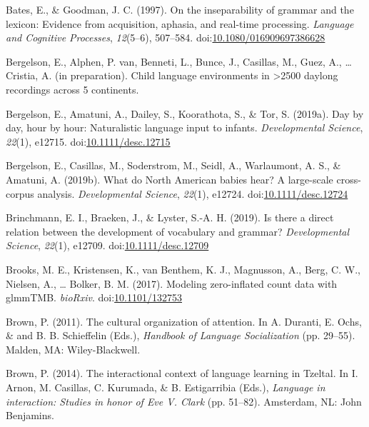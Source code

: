 \documentclass[,man,floatsintext]{apa6}
\begin{document}
\hypertarget{ref-bates1997inseparability}{}
Bates, E., \& Goodman, J. C. (1997). On the inseparability of grammar
and the lexicon: Evidence from acquisition, aphasia, and real-time
processing. \emph{Language and Cognitive Processes}, \emph{12}(5--6),
507--584.
doi:\href{https://doi.org/10.1080/016909697386628}{10.1080/016909697386628}

\hypertarget{ref-bergelsonIPbsl}{}
Bergelson, E., Alphen, P. van, Benneti, L., Bunce, J., Casillas, M.,
Guez, A., \ldots{} Cristia, A. (in preparation). Child language
environments in \textgreater{}2500 daylong recordings across 5
continents.

\hypertarget{ref-bergelson2019day}{}
Bergelson, E., Amatuni, A., Dailey, S., Koorathota, S., \& Tor, S.
(2019a). Day by day, hour by hour: Naturalistic language input to
infants. \emph{Developmental Science}, \emph{22}(1), e12715.
doi:\href{https://doi.org/10.1111/desc.12715}{10.1111/desc.12715}

\hypertarget{ref-bergelsoncasillas2019what}{}
Bergelson, E., Casillas, M., Soderstrom, M., Seidl, A., Warlaumont, A.
S., \& Amatuni, A. (2019b). What do North American babies hear? A
large-scale cross-corpus analysis. \emph{Developmental Science},
\emph{22}(1), e12724.
doi:\href{https://doi.org/10.1111/desc.12724}{10.1111/desc.12724}

\hypertarget{ref-brinchmann2019direct}{}
Brinchmann, E. I., Braeken, J., \& Lyster, S.-A. H. (2019). Is there a
direct relation between the development of vocabulary and grammar?
\emph{Developmental Science}, \emph{22}(1), e12709.
doi:\href{https://doi.org/10.1111/desc.12709}{10.1111/desc.12709}

\hypertarget{ref-brooks2017modeling}{}
Brooks, M. E., Kristensen, K., van Benthem, K. J., Magnusson, A., Berg,
C. W., Nielsen, A., \ldots{} Bolker, B. M. (2017). Modeling
zero-inflated count data with glmmTMB. \emph{bioRxiv}.
doi:\href{https://doi.org/10.1101/132753}{10.1101/132753}

\hypertarget{ref-brown2011cultural}{}
Brown, P. (2011). The cultural organization of attention. In A. Duranti,
E. Ochs, \& and B. B. Schieffelin (Eds.), \emph{Handbook of Language
Socialization} (pp. 29--55). Malden, MA: Wiley-Blackwell.

\hypertarget{ref-brown2014interactional}{}
Brown, P. (2014). The interactional context of language learning in
Tzeltal. In I. Arnon, M. Casillas, C. Kurumada, \& B. Estigarribia
(Eds.), \emph{Language in interaction: Studies in honor of Eve V. Clark}
(pp. 51--82). Amsterdam, NL: John Benjamins.
\end{document}

